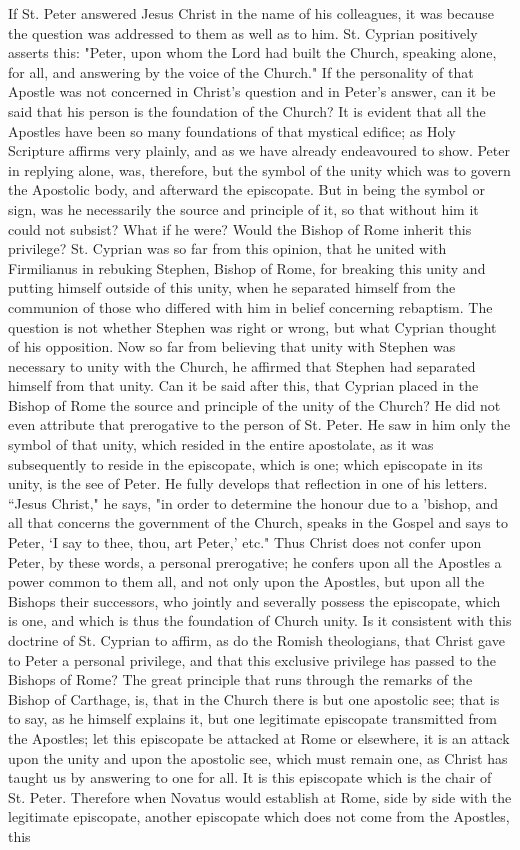 If St. Peter answered Jesus Christ in the name of his colleagues, it was because the question was addressed to them as well as to him. St. Cyprian positively asserts this: "Peter, upon whom the Lord had built the Church, speaking alone, for all, and answering by the voice of the Church." If the personality of that Apostle was not concerned in Christ's question and in Peter's answer, can it be said that his person is the foundation of the Church? It is evident that all the Apostles have been so many foundations of that mystical edifice; as Holy Scripture affirms very plainly, and as we have already endeavoured to show. Peter in replying alone, was, therefore, but the symbol of the unity which was to govern the Apostolic body, and afterward the episcopate. But in being the symbol or sign, was he necessarily the source and principle of it, so that without him it could not subsist? What if he were? Would the Bishop of Rome inherit this privilege? St. Cyprian was so far from this opinion, that he united with Firmilianus in rebuking Stephen, Bishop of Rome, for breaking this unity and putting himself outside of this unity, when he separated himself from the communion of those who differed with him in belief concerning rebaptism. The question is not whether Stephen was right or wrong, but what Cyprian thought of his opposition. Now so far from believing that unity with Stephen was necessary to unity with the Church, he affirmed that Stephen had separated himself from that unity. Can it be said after this, that Cyprian placed in the Bishop of Rome the source and principle of the unity of the Church? He did not even attribute that prerogative to the person of St. Peter. He saw in him only the symbol of that unity, which resided in the entire apostolate, as it was subsequently to reside in the episcopate, which is one; which episcopate in its unity, is the see of Peter. He fully develops that reflection in one of his letters. “Jesus Christ," he says, "in order to determine the honour due to a 'bishop, and all that concerns the government of the Church, speaks in the Gospel and says to Peter, ‘I say to thee, thou, art Peter,' etc." Thus Christ does not confer upon Peter, by these words, a personal prerogative; he confers upon all the Apostles a power common to them all, and not only upon the Apostles, but upon all the Bishops their successors, who jointly and severally possess the episcopate, which is one, and which is thus the foundation of Church unity. Is it consistent with this doctrine of St. Cyprian to affirm, as do the Romish theologians, that Christ gave to Peter a personal privilege, and that this exclusive privilege has passed to the Bishops of Rome? The great principle that runs through the remarks of the Bishop of Carthage, is, that in the Church there is but one apostolic see; that is to say, as he himself explains it, but one legitimate episcopate transmitted from the Apostles; let this episcopate be attacked at Rome or elsewhere, it is an attack upon the unity and upon the apostolic see, which must remain one, as Christ has taught us by answering to one for all. It is this episcopate which is the chair of St. Peter. Therefore when Novatus would establish at Rome, side by side with the legitimate episcopate, another episcopate which does not come from the Apostles, this 